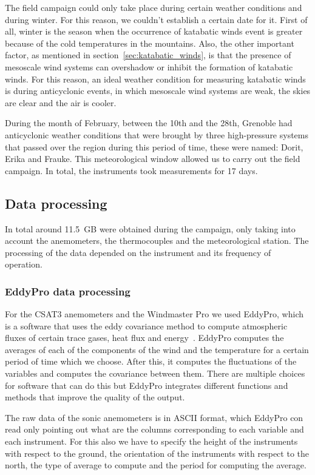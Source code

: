 The field campaign could only take place during certain weather conditions and during winter. For this reason, we couldn't establish a certain date for it. First of all, winter is the season when the occurrence of katabatic winds event is greater because of the cold temperatures in the mountains. Also, the other important factor, as mentioned in section~\ref{sec:katabatic_winds}, is that the presence of mesoscale wind systems can overshadow or inhibit the formation of katabatic winds. For this reason, an ideal weather condition for measuring katabatic winds is during anticyclonic events, in which mesoscale wind systems are weak, the skies are clear and the air is cooler.

During the month of February, between the 10th and the 28th,  Grenoble had anticyclonic weather conditions that were brought by three high-pressure systems that passed over the region during this period of time, these were named: Dorit, Erika and Frauke. This meteorological window allowed us to carry out the field campaign. In total, the instruments took measurements for 17 days.

\subsection{Data processing}

In total around 11.5~GB were obtained during the campaign, only taking into account the anemometers, the thermocouples and the meteorological station. The processing of the data depended on the instrument and its frequency of operation. 

\subsubsection{EddyPro data processing}

For the CSAT3 anemometers and the Windmaster Pro we used EddyPro, which is a software that uses the eddy covariance method to compute atmospheric fluxes of certain trace gases, heat flux and energy~\citep{burba2013eddy}. EddyPro computes the averages of each of the components of the wind and the temperature for a certain period of time which we choose. After this, it computes the fluctuations of the variables and computes the covariance between them. There are multiple choices for software that can do this but EddyPro integrates different functions and methods that improve the quality of the output. 

The raw data of the sonic anemometers is in ASCII format, which EddyPro con read only pointing out what are the columns corresponding to each variable and each instrument. For this also we have to specify the height of the instruments with respect to the ground, the orientation of the instruments with respect to the north, the type of average to compute and the period for computing the average. 

